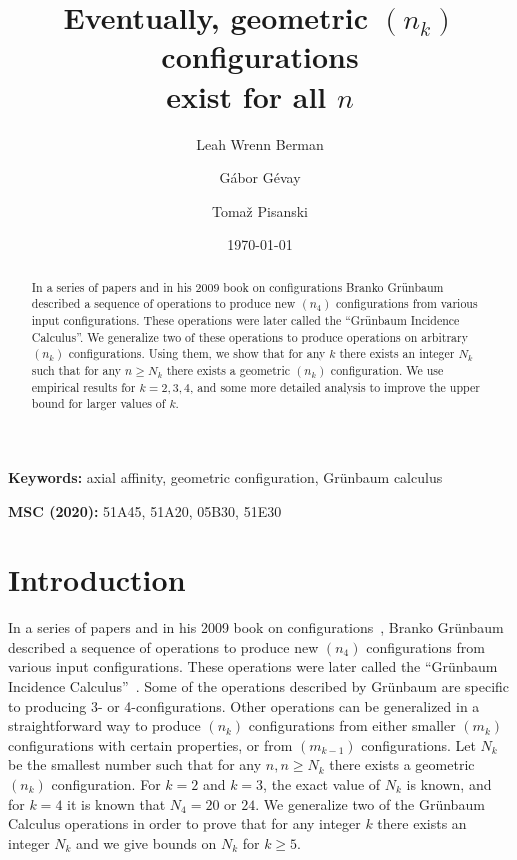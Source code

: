 \documentclass[reqno,12pt]{amsart}
\title[Geometric $(n_{k})$ configurations exist for all $n$]{ 
Eventually, geometric $(n_{k})$ configurations\\ exist for all $n$}
\author[L.W. Berman]{Leah Wrenn Berman}
\author[G. G\'evay]{G\'{a}bor G\'{e}vay}
\author[T. Pisanski]{Toma\v{z} Pisanski}
\date{\today}							%
\theoremstyle{plain}
\theoremstyle{definition}
\theoremstyle{remark}
\begin{document}
\begin{abstract}
In a series of papers and in his 2009 book on configurations  Branko Gr\"unbaum described a sequence of operations 
to produce new $(n_{4})$ configurations from various input configurations. These operations were later called the 
``Gr\"unbaum Incidence Calculus''. We generalize two of these operations to produce operations on arbitrary $(n_{k})$ 
configurations. Using them, we show that for any $k$ there exists an integer $N_k$ such that for any $n \geq N_k$ 
there exists a geometric $(n_k)$ configuration. We use empirical results for $k = 2, 3, 4$, and some more detailed 
analysis to improve the upper bound for larger values of $k$.
\end{abstract}

\maketitle

\textbf{Keywords:} axial affinity, geometric configuration, Gr\"{u}nbaum calculus

\textbf{MSC (2020):} 51A45,  51A20, 05B30, 51E30
\bigskip

\begin{center}
\end{center}
\bigskip

\section{Introduction}

In a series of papers and in his 2009 book on configurations~\cite{Gru2009b}, Branko Gr\"unbaum described a sequence 
of operations to produce new $(n_{4})$ configurations from various input configurations. These operations were later 
called the ``Gr\"unbaum Incidence Calculus''~\cite[Section 6.5]{PisSer2013}. Some of the operations described by 
Gr\"unbaum are specific to producing 3- or 4-configurations. Other operations can be generalized in a straightforward 
way to produce $(n_{k})$ configurations from either smaller $(m_{k})$ configurations with certain properties, or from 
$(m_{k-1})$ configurations. Let $N_{k}$ be the smallest number such that for any $n, n \geq N_k$ there exists a geometric $(n_k)$ configuration.
For $k = 2$ and $k = 3$, the exact value of $N_{k}$ is known, and for $k = 4$ it is known that $N_{4} = 20$ or $24$. 
We generalize two of the Gr\"unbaum Calculus operations in order to prove that for any integer $k$ there exists an 
integer $N_k$  and we give bounds on $N_{k}$ for $k \geq 5$.
\end{document}
